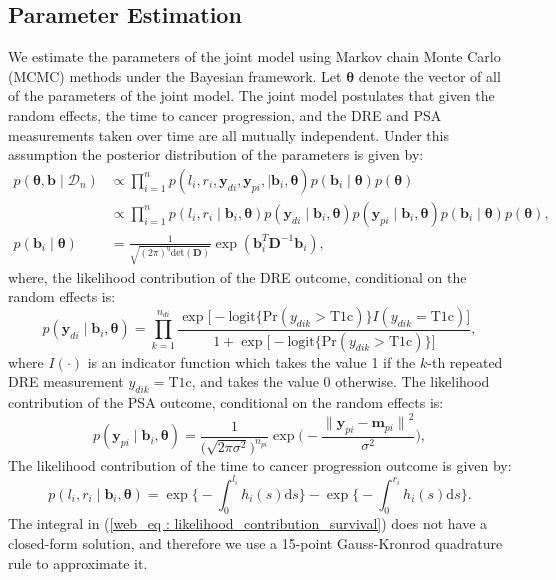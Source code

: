 \subsection{Parameter Estimation}
We estimate the parameters of the joint model using Markov chain Monte Carlo (MCMC) methods under the Bayesian framework. Let $\boldsymbol{\theta}$ denote the vector of all of the parameters of the joint model. The joint model postulates that given the random effects, the time to cancer progression, and the DRE and PSA measurements taken over time are all mutually independent. Under this assumption the posterior distribution of the parameters is given by:
\begin{align*}
p(\boldsymbol{\theta}, \boldsymbol{b} \mid \mathcal{D}_n) & \propto \prod_{i=1}^n p(l_i, r_i, \boldsymbol{y}_{di}, \boldsymbol{y}_{pi}, \mid \boldsymbol{b}_i, \boldsymbol{\theta}) p(\boldsymbol{b}_i \mid \boldsymbol{\theta}) p(\boldsymbol{\theta})\\
& \propto \prod_{i=1}^n p(l_i, r_i \mid \boldsymbol{b}_i, \boldsymbol{\theta}) p(\boldsymbol{y}_{di} \mid \boldsymbol{b}_i, \boldsymbol{\theta}) p(\boldsymbol{y}_{pi} \mid \boldsymbol{b}_i, \boldsymbol{\theta}) p(\boldsymbol{b}_i \mid \boldsymbol{\theta}) p(\boldsymbol{\theta}),\\
p(\boldsymbol{b}_i \mid \boldsymbol{\theta}) &= \frac{1}{\sqrt{(2 \pi)^q \text{det}(\boldsymbol{D})}} \exp(\boldsymbol{b}_i^T \boldsymbol{D}^{-1} \boldsymbol{b}_i),
\end{align*}
where, the likelihood contribution of the DRE outcome, conditional on the random effects is:
\begin{equation*}
p(\boldsymbol{y}_{di} \mid \boldsymbol{b}_i, \boldsymbol{\theta}) = \prod_{k=1}^{n_{di}} \frac{\exp\Big[-\mbox{logit} \big\{\mbox{Pr}(y_{dik} > \mbox{T1c})\big\} I(y_{dik}=\mbox{T1c}) \Big]}  {1+\exp\Big[-\mbox{logit} \big\{\mbox{Pr}(y_{dik} > \mbox{T1c})\big\}\Big]},
\end{equation*}
where $I(\cdot)$ is an indicator function which takes the value 1 if the $k$-th repeated DRE measurement ${y_{dik}=\mbox{T1c}}$, and takes the value 0 otherwise. The likelihood contribution of the PSA outcome, conditional on the random effects is:
\begin{equation*}
p(\boldsymbol{y}_{pi} \mid \boldsymbol{b}_i, \boldsymbol{\theta}) = \frac{1}{\big(\sqrt{2 \pi \sigma^2}\big)^{n_{pi}}} \exp\bigg(-\frac{{\lVert{\boldsymbol{y}_{pi} - \boldsymbol{m}_{pi}}\rVert}^2}{\sigma^2}\bigg),
\end{equation*}
The likelihood contribution of the time to cancer progression outcome is given by:
\begin{equation}
\label{web_eq : likelihood_contribution_survival}
p(l_i,r_i\mid \boldsymbol{b}_i,\boldsymbol{\theta}) = \exp\Big\{-\int_0^{l_i} h_i(s)\mathrm{d}{s}\Big\} - \exp\Big\{-\int_0^{r_i}h_i(s)\mathrm{d}{s}\Big\}.
\end{equation}
The integral in (\ref{web_eq : likelihood_contribution_survival}) does not have a closed-form solution, and therefore we use a 15-point Gauss-Kronrod quadrature rule to approximate it.

